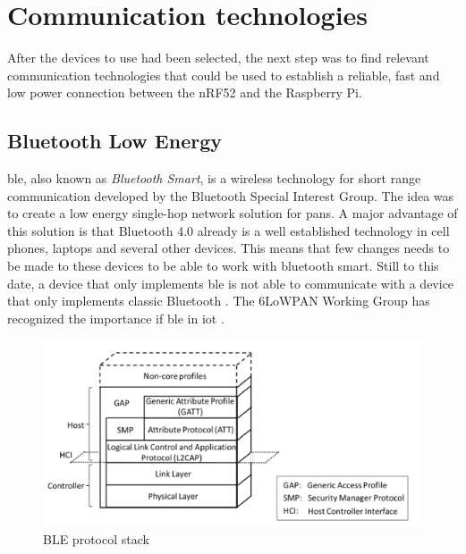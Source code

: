 \section{Communication technologies}

After the devices to use had been selected, the next step was to find relevant communication technologies that could be used to establish a reliable, fast and low power connection between the \gls{nRF52} and the \gls{Raspberry Pi}. 

\subsection{Bluetooth Low Energy}

\gls{ble}, also known as \textit{Bluetooth Smart}, is a wireless technology for short range communication developed by the Bluetooth Special Interest Group. The idea was to create a low energy single-hop network solution for \glspl{pan}. A major advantage of this solution is that Bluetooth 4.0 already is a well established technology in cell phones, laptops and several other devices. This means that few changes needs to be made to these devices to be able to work with bluetooth smart. Still to this date, a device that only implements \gls{ble} is not able to communicate with a device that only implements classic Bluetooth \cite{gomez2012overview}.
The 6LoWPAN Working Group has recognized the importance if \gls{ble} in \gls{iot} \cite{hui2008extending} .

\begin{figure}[ht]
    \centering
    \includegraphics[scale=0.7]{BLEprotocolStack.png}    
    \caption{BLE protocol stack}
    \label{fig:BLEprotocolStack}
\end{figure}

